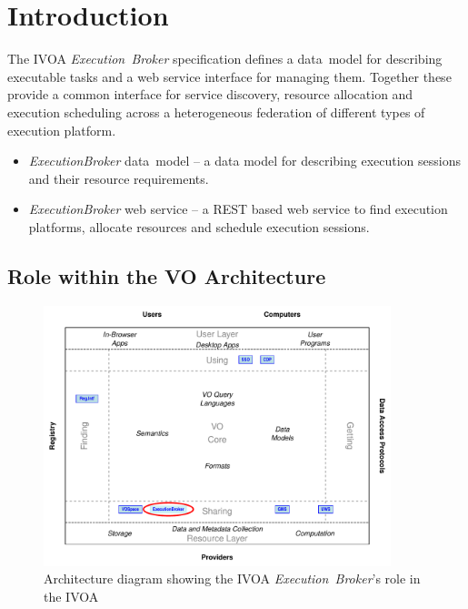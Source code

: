 \documentclass[11pt,a4paper]{ivoa}
\newcommand{\rest} {REST}
\newcommand{\datamodel} {data~model}
\newcommand{\webservice} {web service}
\newcommand{\ivoa} {IVOA}
\newcommand{\execbrokerclass} {\textit{ExecutionBroker}}
\newcommand{\executionbroker} {\textit{Execution~Broker}}
\begin{document}
\section{Introduction}
\label{sect-introduction}

The \ivoa{} \executionbroker{} specification defines a \datamodel{} for describing executable tasks
and a \webservice{} interface for managing them.
Together these provide a common interface for service discovery, resource allocation
and execution scheduling across a heterogeneous federation of different types of
execution platform.

\begin{itemize}
    \item \execbrokerclass{} \datamodel{}  – a data model for describing execution sessions and their resource requirements.
    \item \execbrokerclass{} \webservice{} – a \rest{} based web service to find execution platforms, allocate resources and schedule execution sessions.
\end{itemize}

\subsection{Role within the VO Architecture}
\label{sub-ivoa-role}

\begin{figure}
\centering
\includegraphics[width=0.9\textwidth]{role_diagram.pdf}
\caption{Architecture diagram showing the \ivoa{} \executionbroker{}'s role in the \ivoa}
\label{fig:archdiag}
\end{figure}
\end{document}
